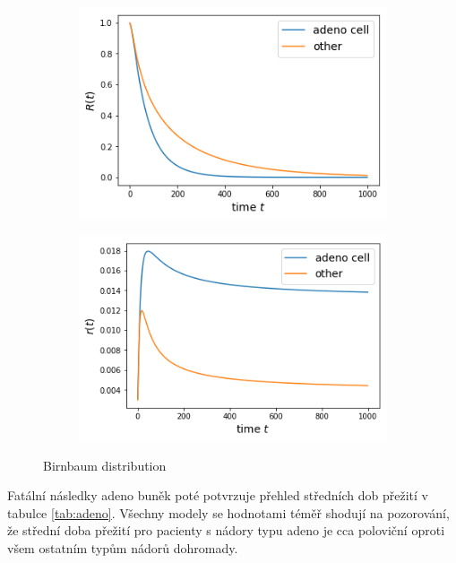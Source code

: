 \documentclass[10pt]{article}
\begin{document}
    \begin{figure}[htb!]
\centering
    \begin{subfigure}{.4\linewidth}
    \centering
    \includegraphics[width=.99\textwidth]{Images/cell/Sbir.png}
  \end{subfigure}%
    \begin{subfigure}{.4\linewidth}
    \centering
    \includegraphics[width=.99\textwidth]{Images/cell/rbir.png}
  \end{subfigure}%
  \caption{Birnbaum distribution}\label{fig:karexp} 
   \end{figure} 

Fatální následky adeno buněk poté potvrzuje přehled středních dob přežití v tabulce \ref{tab:adeno}. Všechny modely se hodnotami téměř shodují na pozorování, že střední doba přežití pro pacienty s nádory typu adeno je cca poloviční oproti všem ostatním typům nádorů dohromady. 
\end{document}

